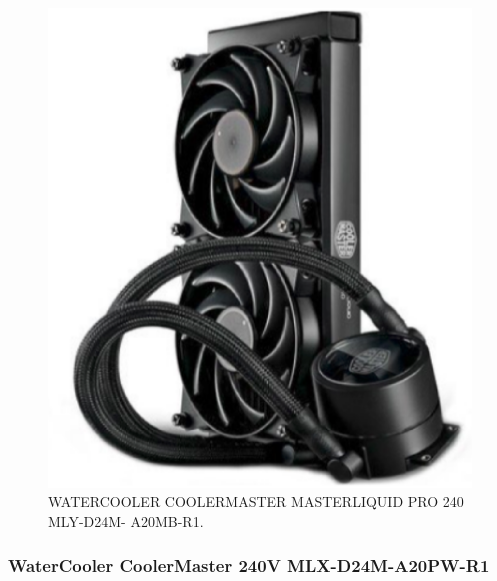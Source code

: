 \begin{figure}[!htb]                                                               
   \centering                                                                      
   \includegraphics[scale=0.4, keepaspectratio=true]{figuras/watercooler2.eps}
   \caption{WATERCOOLER COOLERMASTER MASTERLIQUID PRO 240 MLY-D24M- A20MB-R1.}               
\end{figure}

\subsubsection{WaterCooler CoolerMaster 240V MLX-D24M-A20PW-R1}


